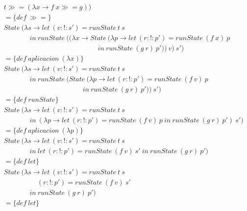 \documentclass[11pt]{article}
\begin{document}
\begin{align*}
    &t \mathrel{\gg \! \! =} (\lambda x \to f\ x \mathrel{\gg \! \! =} g)) \\
    &= \{def\ \mathrel{\gg \! \! =} \}\\
    &State\ (\lambda s \to let\ (v :\mathrel{!}: s') = runState\ t\ s\ \\
    &\ \ \ \ \ \ \ \ \ \ \ \ \ \ \ \ \ in\ runState\ ((\lambda x \to State\ (\lambda p \to let\ (r :\mathrel{!}: p') = runState\ (f\ x)\ p\ \\
    &\ \ \ \ \ \ \ \ \ \ \ \ \ \ \ \ \ \ \ \ \ \ \ \ \ \ \ \ \ \ \ \ \ \ \ \ \ \ \ \ \ \ \ \ \ \ \ \ \ \ \ \ \ \ \ \ \ \ \ \ \ \ in\ runState\ (g\ r)\ p'))\ v)\ s') \\ 
    &= \{def\ aplicacion\ (\lambda x)\} \\
    &State\ (\lambda s \to let\ (v :\mathrel{!}: s') = runState\ t\ s\ \\
    &\ \ \ \ \ \ \ \ \ \ \ \ \ \ \ \ \ in\ runState\ (State\ (\lambda p \to let\ (r :\mathrel{!}: p') = runState\ (f\ v)\ p\ \\
    &\ \ \ \ \ \ \ \ \ \ \ \ \ \ \ \ \ \ \ \ \ \ \ \ \ \ \ \ \ \ \ \ \ \ \ \ \ \ \ \ \ \ \ \ \ \ \ \ \ \ \ \ in\ runState\ (g\ r)\ p'))\ s') \\ 
    &= \{def\ runState\} \\
    &State\ (\lambda s \to let\ (v :\mathrel{!}: s') = runState\ t\ s\ \\
    &\ \ \ \ \ \ \ \ \ \ \ \ \ \ \ \ \ in\ (\lambda p \to let\ (r :\mathrel{!}: p') = runState\ (f\ v)\ p\ 
                                              in\ runState\ (g\ r)\ p')\ s') \\ 
    &= \{def\ aplicacion\ (\lambda p)\} \\
    &State\ (\lambda s \to let\ (v :\mathrel{!}: s') = runState\ t\ s\ \\
    &\ \ \ \ \ \ \ \ \ \ \ \ \ \ \ \ \ in\ let\ (r :\mathrel{!}: p') = runState\ (f\ v)\ s'\ 
                                           in\ runState\ (g\ r)\ p') \\ 
    &= \{def\ let\} \\
    &State\ (\lambda s \to let\ (v :\mathrel{!}: s') = runState\ t\ s\ \\
    &\ \ \ \ \ \ \ \ \ \ \ \ \ \ \ \ \ \ \ \ \ \ (r :\mathrel{!}: p') = runState\ (f\ v)\ s'\\
    &\ \ \ \ \ \ \ \ \ \ \ \ \ \ \ \ \ in\ runState\ (g\ r)\ p') \\ 
    &= \{def\ let\} \\

\end{align*}
\end{document}
